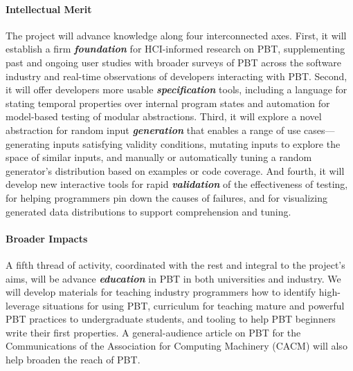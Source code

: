 \paragraph*{Intellectual Merit}
The project will advance knowledge along four interconnected axes.
%
First, it will establish a firm {\bf\em foundation} for HCI-informed
research on PBT, supplementing past and ongoing user studies with
broader surveys of PBT across the software industry and real-time
observations of developers interacting with PBT.
%
Second, it will offer developers more usable {\bf\em specification} tools,
including a language for stating temporal properties over internal
program states and automation for model-based testing of
modular abstractions.
%
Third, it will explore a novel abstraction for random input {\bf\em
  generation} that enables a range of use cases---generating inputs
satisfying validity conditions, mutating inputs to explore the space
of similar inputs, and manually or automatically tuning a random
generator's distribution based on examples or code coverage.
%
And fourth, it will develop new interactive tools for rapid {\bf\em
  validation} of the effectiveness of testing, for helping programmers pin
down the causes of failures, and for visualizing generated data
distributions to support comprehension and tuning.


\paragraph*{Broader Impacts}
A fifth thread of activity, coordinated with the rest and integral to the
project's aims, will be advance {\bf\em education} in PBT in both universities and industry. We will
develop materials for teaching industry programmers how to identify
high-leverage situations for using PBT, curriculum for teaching mature
and powerful PBT practices to undergraduate students, and tooling to help
PBT beginners write their first properties.
%
A general-audience article on PBT for the Communications of the
Association for Computing Machinery (CACM) will also help broaden the
reach of PBT.

